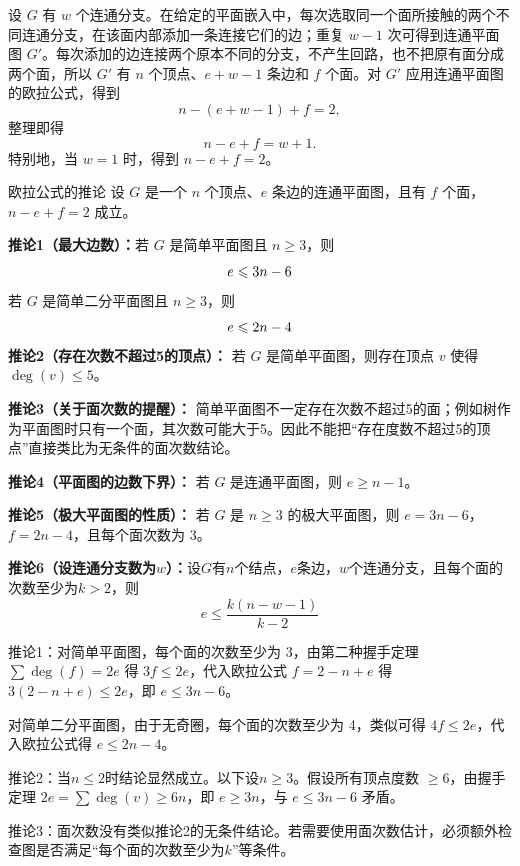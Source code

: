 \documentclass[lang=cn,11pt]{elegantbook}
\begin{document}
设 $G$ 有 $w$ 个连通分支。在给定的平面嵌入中，每次选取同一个面所接触的两个不同连通分支，在该面内部添加一条连接它们的边；重复 $w-1$ 次可得到连通平面图 $G'$。每次添加的边连接两个原本不同的分支，不产生回路，也不把原有面分成两个面，所以 $G'$ 有 $n$ 个顶点、$e+w-1$ 条边和 $f$ 个面。对 $G'$ 应用连通平面图的欧拉公式，得到
\[
n-(e+w-1)+f=2,
\]
整理即得
\[
n-e+f=w+1.
\]
特别地，当 $w=1$ 时，得到 $n-e+f=2$。
\begin{theorem}{欧拉公式的推论}
    设 $G$ 是一个 $n$ 个顶点、$e$ 条边的连通平面图，且有 $f$ 个面，$n-e+f=2$ 成立。

\textbf{推论1（最大边数）：}若 $G$ 是简单平面图且 $n \geqslant 3$，则\vspace{-10pt}
\[
e \leqslant 3n - 6\vspace{-10pt}
\]
若 $G$ 是简单二分平面图且 $n \geqslant 3$，则\vspace{-10pt}
\[
e \leqslant 2n - 4\vspace{-10pt}
\]
\textbf{推论2（存在次数不超过5的顶点）：}
若 $G$ 是简单平面图，则存在顶点 $v$ 使得 $\deg(v) \leqslant 5$。

\textbf{推论3（关于面次数的提醒）：}
简单平面图不一定存在次数不超过5的面；例如树作为平面图时只有一个面，其次数可能大于5。因此不能把“存在度数不超过5的顶点”直接类比为无条件的面次数结论。

\textbf{推论4（平面图的边数下界）：}
若 $G$ 是连通平面图，则 $e \geqslant n-1$。

\textbf{推论5（极大平面图的性质）：}
若 $G$ 是 $n \geqslant 3$ 的极大平面图，则 $e = 3n-6$，$f = 2n-4$，且每个面次数为 3。

\textbf{推论6（设连通分支数为$w$）：}设$G$有$n$个结点，$e$条边，$w$个连通分支，且每个面的次数至少为$k>2$，则\vspace{-10pt}\[e\leqslant \dfrac{k(n-w-1)}{k-2}\]
\end{theorem}
推论1：对简单平面图，每个面的次数至少为 3，由第二种握手定理 $\sum \deg(f) = 2e$ 得 $3f \leqslant 2e$，代入欧拉公式 $f = 2 - n + e$ 得 $3(2-n+e) \leqslant 2e$，即 $e \leqslant 3n-6$。

对简单二分平面图，由于无奇圈，每个面的次数至少为 4，类似可得 $4f \leqslant 2e$，代入欧拉公式得 $e \leqslant 2n-4$。

推论2：当$n\leqslant2$时结论显然成立。以下设$n\geqslant3$。假设所有顶点度数 $\geqslant 6$，由握手定理 $2e = \sum \deg(v) \geqslant 6n$，即 $e \geqslant 3n$，与 $e \leqslant 3n-6$ 矛盾。

推论3：面次数没有类似推论2的无条件结论。若需要使用面次数估计，必须额外检查图是否满足“每个面的次数至少为$k$”等条件。
\end{document}
